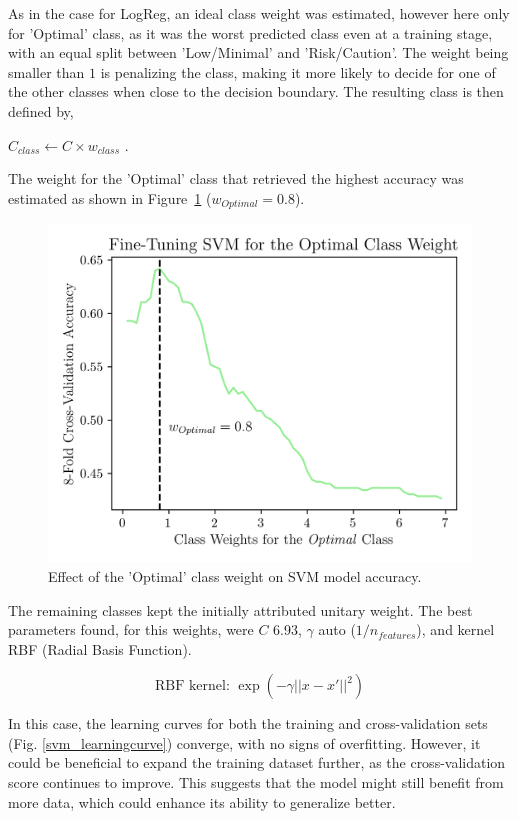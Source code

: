 \documentclass[conference]{IEEEtran}
\begin{document}
As in the case for LogReg, an ideal class weight was estimated, however here only for 'Optimal' class, as it was the worst predicted class even at a training stage, with an equal split between 'Low/Minimal' and 'Risk/Caution'. The weight being smaller than $1$ is penalizing the class, making it more likely to decide for one of the other classes when close to the decision boundary. The resulting class is then defined by,

$C_{class} \leftarrow C \times w_{class}$ \cite{svm24}.

The weight for the 'Optimal' class that retrieved the highest accuracy was estimated as shown in Figure~\ref{svm_weight} ($w_{Optimal}=0.8$). 

\begin{figure}[H]
    \centering
    \includegraphics[width=1\linewidth]{assets/SVM_OptimalWeight.png}
    \caption{Effect of the 'Optimal' class weight on SVM model accuracy.}
    \label{svm_weight}
\end{figure} %

The remaining classes kept the initially attributed unitary weight. The best parameters found, for this weights, were $C$ 6.93, $\gamma$ auto ($1/n_{features}$), and kernel RBF (Radial Basis Function).

$$\text{RBF kernel: } \exp(-\gamma ||x - x'||^2)$$ %

In this case, the learning curves  for both the training and cross-validation sets (Fig. \ref{svm_learningcurve}) converge, with no signs of overfitting. However, it could be beneficial to expand the training dataset further, as the cross-validation score continues to improve. This suggests that the model might still benefit from more data, which could enhance its ability to generalize better.
\end{document}
